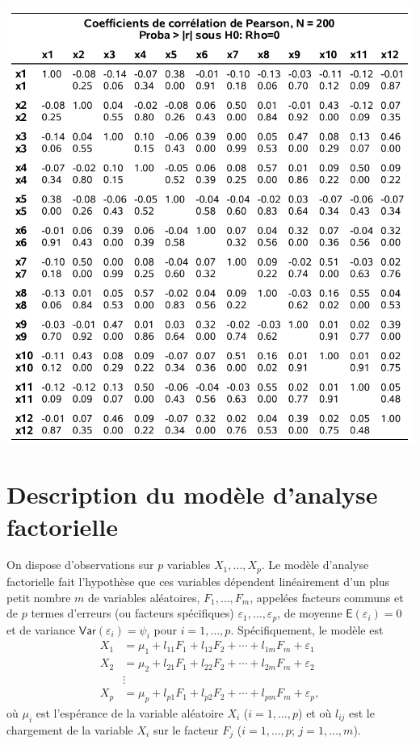 \documentclass[
]{book}
\theoremstyle{definition}
\theoremstyle{definition}
\theoremstyle{definition}
\theoremstyle{remark}
\begin{document}
\begin{center}\includegraphics[width=0.9\linewidth]{figures/01-facto-e2} \end{center}

\hypertarget{description-du-moduxe8le-danalyse-factorielle}{%
\section{Description du modèle d'analyse factorielle}\label{description-du-moduxe8le-danalyse-factorielle}}

On dispose d'observations sur \(p\) variables \(X_1, \ldots, X_p\). Le modèle d'analyse factorielle fait l'hypothèse que ces variables dépendent linéairement d'un plus petit nombre \(m\) de variables aléatoires, \(F_1, \ldots, F_m\), appelées facteurs communs et de \(p\) termes d'erreurs (ou facteurs spécifiques) \(\varepsilon_1, \ldots, \varepsilon_p\), de moyenne \({\mathsf E}\left(\varepsilon_i\right)=0\) et de variance \({\mathsf{Var}}\left(\varepsilon_i\right)=\psi_i\) pour \(i=1, \ldots, p\). Spécifiquement, le modèle est
\begin{align*}
X_1 &= \mu_1 + l_{11}F_1 + l_{12} F_2 + \cdots + l_{1m}F_m + \varepsilon_1\\
X_2 &= \mu_2 + l_{21}F_1 + l_{22} F_2 + \cdots + l_{2m}F_m + \varepsilon_2\\
&\vdots \\
X_p &= \mu_p + l_{p1}F_1 + l_{p2} F_2 + \cdots + l_{pm}F_m + \varepsilon_p, 
\end{align*}
où \(\mu_i\) est l'espérance de la variable aléatoire \(X_i\) (\(i=1, \ldots, p\)) et où \(l_{ij}\) est le chargement de la variable \(X_i\) sur le facteur \(F_j\) (\(i=1, \ldots, p\); \(j=1, \ldots, m\)).
\end{document}
